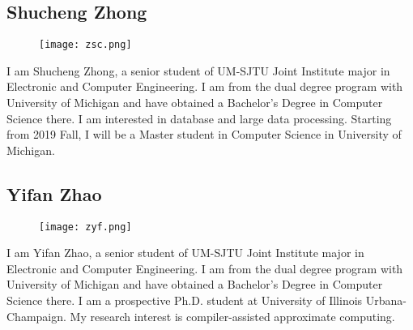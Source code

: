 \subsection{Shucheng Zhong}
\begin{figure}[htbp]
  \centering \texttt{[image: zsc.png]}
  \label{fig:zsc}
\end{figure}
I am Shucheng Zhong, a senior student of UM-SJTU Joint Institute major in
Electronic and Computer Engineering. I am from the dual degree program with
University of Michigan and have obtained a Bachelor's Degree in Computer
Science there. I am interested in database and large data processing. Starting
from 2019 Fall, I will be a Master student in Computer Science in University of
Michigan.

\newpage

\subsection{Yifan Zhao}
\begin{figure}[h]
  \centering \texttt{[image: zyf.png]}
  \label{fig:zyf}
\end{figure}
I am Yifan Zhao, a senior student of UM-SJTU Joint Institute major in
Electronic and Computer Engineering. I am from the dual degree program with
University of Michigan and have obtained a Bachelor's Degree in Computer
Science there. I am a prospective Ph.D. student at University of Illinois
Urbana-Champaign. My research interest is compiler-assisted approximate
computing.
